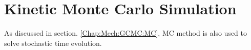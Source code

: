 \section{Kinetic Monte Carlo Simulation}
As discussed in section. \ref{Chap:Mech:GCMC:MC}, \ac{MC} method is also used to solve stochastic time evolution.